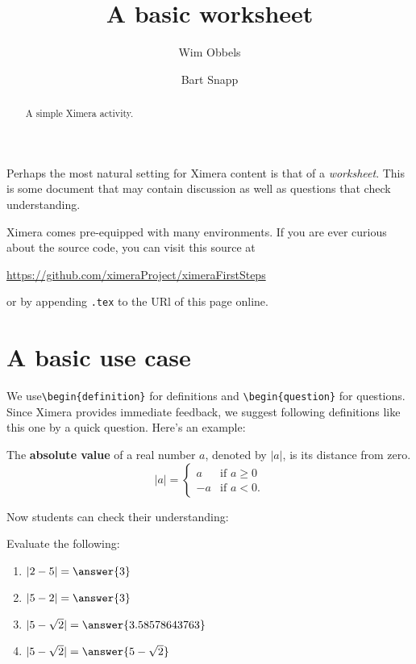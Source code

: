 \documentclass{ximera}
\author{Wim Obbels \and Bart Snapp}
\title{A basic worksheet}
\begin{document}
\begin{abstract}
    A simple Ximera activity.
\end{abstract}
\maketitle

Perhaps the most natural setting for Ximera content is that of a
\textit{worksheet}. This is some document that may contain discussion as well
as questions that check understanding.

Ximera comes pre-equipped with many environments.  If you are ever curious about
the source code, you can visit this source at

\begin{center}
    \url{https://github.com/ximeraProject/ximeraFirstSteps}
\end{center}
or by appending \verb|.tex| to the URl of this page online. 


\section{A basic use case}
We use\verb|\begin{definition}| for definitions and \verb|\begin{question}| for
questions. Since Ximera provides immediate feedback, we suggest following
definitions like this one by a quick question. Here's an example:

\begin{definition}
    The \textbf{absolute value} of a real number $a$, denoted by $|a|$, is its distance from zero.
    \[
        |a| = \begin{cases}
            a  & \text{if $a \geq 0$} \\
            -a & \text{if $a<0$.}
        \end{cases}
    \]
\end{definition}
Now students can check their understanding:
\begin{question}
    Evaluate the following:
    \begin{enumerate}
        \item $|2-5| = \answer{3}$
        \item $|5-2| = \answer{3}$
        \item $|5-\sqrt{2}| = \answer{3.58578643763}$
        \item $|5-\sqrt{2}| = \answer{5-\sqrt{2}}$
    \end{enumerate}
\end{question}
\end{document}
